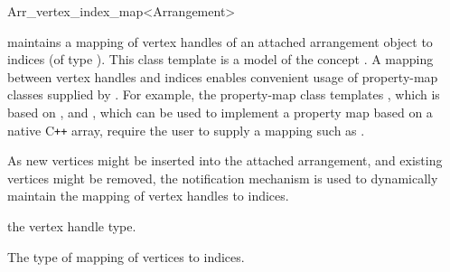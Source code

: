 
\ccRefPageBegin

\begin{ccRefClass}{Arr_vertex_index_map<Arrangement>}
\label{arr_ref:arr_vertex_index_map}

\ccDefinition

\ccClassTemplateName{} maintains a mapping of vertex handles of an
attached arrangement object to indices (of type ).
This class template is a model of the \boost{} concept
. A mapping between vertex handles and indices
enables convenient usage of property-map classes supplied by \boost{}.
For example, the property-map class templates
, which is based on ,
and , which can be used to implement
a property map based on a native C\hbox{\tt ++} array, require the
user to supply a mapping such as \ccClassTemplateName{}.

As new vertices might be inserted into the attached arrangement, and
existing vertices might be removed, the notification mechanism is used
to dynamically maintain the mapping of vertex handles to indices.


\ccIsModel
  
\ccInheritsFrom{}


\ccTypes


    {the vertex handle type.}

\ccGlue
{}
\ccGlue
{}
\ccGlue
{}

    {The type of mapping of vertices to indices.}


\end{ccRefClass}
